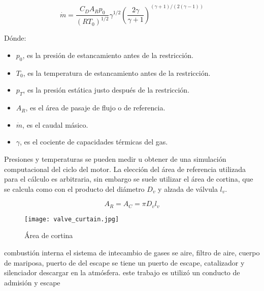 \begin{equation}\label{eq:m_bloqueado} \dot{m}=  \frac {C_D A_R p_0} {{(R T_0)}^{1/2}} \gamma^{1/2} {\left( \frac{2\gamma}{\gamma+1} \right)}^{(\gamma+1)/(2(\gamma-1))}
\end{equation}

Dónde:

\begin{itemize}
    \item $p_0$, es la presión de estancamiento antes de la restricción.
    \item $T_0$, es la temperatura de estancamiento antes de la restricción.
    \item $p_T$, es la presión estática justo después de la restricción.
    \item $A_R$, es el área de pasaje de flujo o de referencia.
    \item $\dot{m}$, es el caudal másico.


  \item $\gamma$, es el cociente de capacidades térmicas del gas.
\end{itemize}

Presiones y temperaturas se pueden medir u obtener de una simulación
computacional del ciclo del motor.
%
La elección del área de referencia utilizada para el cálculo es arbitraria, sin
embargo se suele utilizar el área de cortina, que se calcula como con el
producto del diámetro $D_{v}$ y alzada de válvula $l_{v}$.

\begin{equation} \label{eq:area_cortina} A_R = A_C = \pi D_v l_v
\end{equation}

\begin{figure} \centering
\texttt{[image: valve\_curtain.jpg]}
  \caption{Área de cortina}\label{fig:area_cortina}
\end{figure}


combustión interna el sistema de intecambio de gases se %
aire, filtro de aire, cuerpo de mariposa, puerto de %
del escape se tiene un puerto de escape, catalizador y silenciador %
descargar en la atmósfera.  %
este trabajo es utilizó un %
conducto de admisión y escape %

